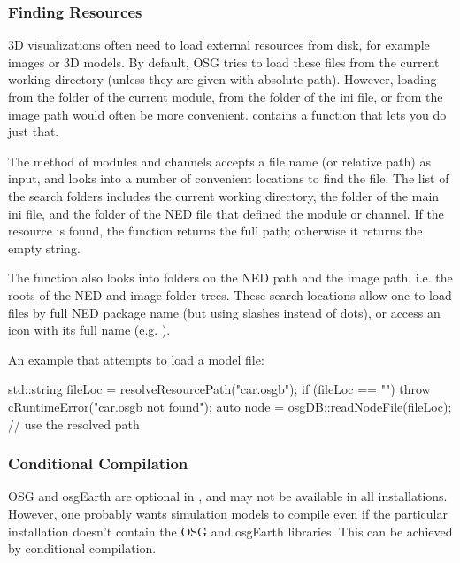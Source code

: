 \subsubsection{Finding Resources}
\label{sec:graphics:finding-resources}

3D visualizations often need to load external resources from disk, for
example images or 3D models. By default, OSG tries to load these files
from the current working directory (unless they are given with absolute path).
However, loading from the folder of the current {\opp} module, from the folder
of the ini file, or from the image path would often be more convenient.
{\opp} contains a function that lets you do just that.

The  method of modules and channels accepts a
file name (or relative path) as input, and looks into a number of convenient
locations to find the file. The list of the search folders includes
the current working directory, the folder of the main ini file, and the folder
of the NED file that defined the module or channel.
If the resource is found, the function returns the full path; otherwise
it returns the empty string.

The function also looks into folders on the NED path and the image
path, i.e. the roots of the NED and image folder trees. These search
locations allow one to load files by full NED package name (but using
slashes instead of dots), or access an icon with its full name (e.g.
).

An example that attempts to load a  model file:

\begin{cpp}
std::string fileLoc = resolveResourcePath("car.osgb");
if (fileLoc == "")
    throw cRuntimeError("car.osgb not found");
auto node = osgDB::readNodeFile(fileLoc); // use the resolved path
\end{cpp}


\subsubsection{Conditional Compilation}
\label{sec:graphics:osg-conditional-compilation}

OSG and osgEarth are optional in {\opp}, and may not be available in all
installations. However, one probably wants simulation models to compile
even if the particular {\opp} installation doesn't contain the OSG and
osgEarth libraries. This can be achieved by conditional compilation.

